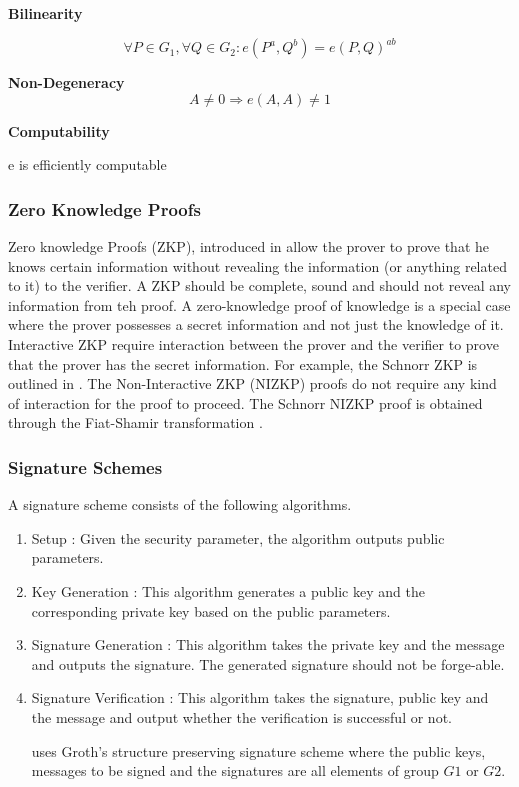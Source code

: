 \documentclass[journal]{IEEEtran}
\begin{document}
\textbf{Bilinearity}

$$\forall P \in G_1, \forall Q \in G_2 : e(P^a, Q^b) = e(P,Q)^{ab}$$

\textbf{Non-Degeneracy}
$$ A \neq 0 \Rightarrow e(A,A) \neq 1$$

\textbf{Computability}

 e is efficiently computable


\subsubsection{Zero Knowledge Proofs}
Zero knowledge Proofs (ZKP), introduced in \cite{zkp} allow the prover to prove that he knows certain information without revealing the information (or anything related to it) to the verifier. A ZKP should be complete, sound and should not reveal any information from teh proof. A zero-knowledge proof of knowledge is a special case where the prover possesses a secret information and not just the knowledge of it. Interactive ZKP require interaction between the prover and the verifier to prove that the prover has the secret information. For example, the Schnorr ZKP is outlined in \cite{rfc8235}. The Non-Interactive ZKP (NIZKP) proofs do not require any kind of interaction for the proof to proceed. The Schnorr NIZKP proof is obtained through the Fiat-Shamir transformation \cite{Fiat1986HowTP}.

\subsubsection{Signature Schemes}
A signature scheme consists of the following algorithms.
\begin{enumerate}[label=\alph*)]
	\item Setup : Given the security parameter, the algorithm outputs public parameters.
	\item Key Generation : This algorithm generates a public key and the corresponding private key based on the public parameters.
	\item Signature Generation : This algorithm takes the private key and the message and outputs the signature. The generated signature should not be forge-able.
	\item Signature Verification : This algorithm takes the signature, public key and the message and output whether the verification is successful or not.
	
\cite{CamenischDD17} uses Groth's structure preserving signature scheme \cite{groth} where the public keys, messages to be signed and the signatures are all elements of group $G1$ or $G2$.

\end{enumerate}
\end{document}
